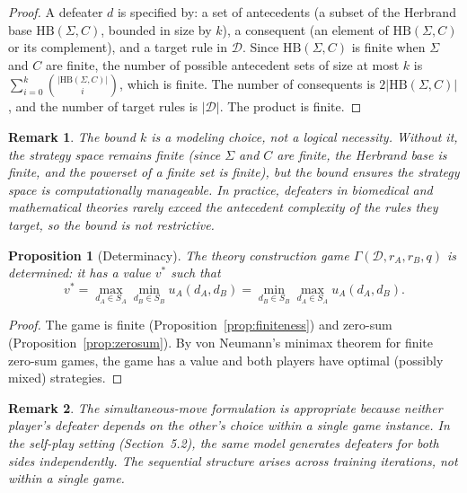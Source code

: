 \documentclass[11pt]{article}
\newtheorem{proposition}{Proposition}
\newtheorem{remark}{Remark}
\newcommand{\D}{\mathcal{D}}
\begin{document}
\begin{proof}
A defeater $d$ is specified by: a set of antecedents (a subset of the Herbrand base $\mathrm{HB}(\Sigma, C)$, bounded in size by $k$), a consequent (an element of $\mathrm{HB}(\Sigma, C)$ or its complement), and a target rule in $\D$. Since $\mathrm{HB}(\Sigma, C)$ is finite when $\Sigma$ and $C$ are finite, the number of possible antecedent sets of size at most $k$ is $\sum_{i=0}^{k} \binom{|\mathrm{HB}(\Sigma, C)|}{i}$, which is finite. The number of consequents is $2|\mathrm{HB}(\Sigma, C)|$, and the number of target rules is $|\D|$. The product is finite.
\end{proof}
 
\begin{remark}
The bound $k$ is a modeling choice, not a logical necessity. Without it, the strategy space remains finite (since $\Sigma$ and $C$ are finite, the Herbrand base is finite, and the powerset of a finite set is finite), but the bound ensures the strategy space is computationally manageable. In practice, defeaters in biomedical and mathematical theories rarely exceed the antecedent complexity of the rules they target, so the bound is not restrictive.
\end{remark}
 
\begin{proposition}[Determinacy]\label{prop:determinacy}
The theory construction game $\Gamma(\D, r_A, r_B, q)$ is determined: it has a value $v^*$ such that
\[
    v^* = \max_{d_A \in S_A} \min_{d_B \in S_B} u_A(d_A, d_B) = \min_{d_B \in S_B} \max_{d_A \in S_A} u_A(d_A, d_B).
\]
\end{proposition}
 
\begin{proof}
The game is finite (Proposition~\ref{prop:finiteness}) and zero-sum (Proposition~\ref{prop:zerosum}). By von Neumann's minimax theorem for finite zero-sum games, the game has a value and both players have optimal (possibly mixed) strategies.
\end{proof}
 
\begin{remark}
The simultaneous-move formulation is appropriate because neither player's defeater depends on the other's choice within a single game instance. In the self-play setting (Section~5.2), the same model generates defeaters for both sides independently. The sequential structure arises across training iterations, not within a single game.
\end{remark}
 
\end{document}
